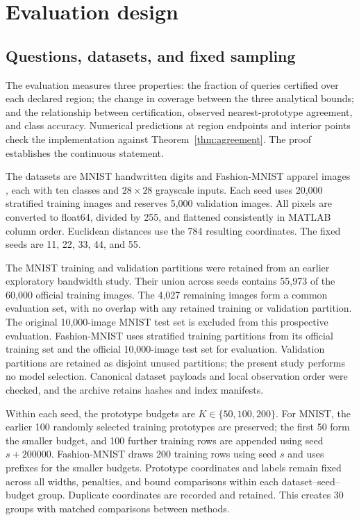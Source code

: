 \documentclass[preprint,12pt]{elsarticle}
\begin{document}
\section{Evaluation design}
\subsection{Questions, datasets, and fixed sampling}
The evaluation measures three properties: the fraction of queries certified over each declared region; the change in coverage between the three analytical bounds; and the relationship between certification, observed nearest-prototype agreement, and class accuracy. Numerical predictions at region endpoints and interior points check the implementation against Theorem~\ref{thm:agreement}. The proof establishes the continuous statement.

The datasets are MNIST handwritten digits \citep{lecun1998} and Fashion-MNIST apparel images \citep{xiao2017fashion}, each with ten classes and $28\times28$ grayscale inputs. Each seed uses 20,000 stratified training images and reserves 5,000 validation images. All pixels are converted to float64, divided by 255, and flattened consistently in MATLAB column order. Euclidean distances use the 784 resulting coordinates. The fixed seeds are 11, 22, 33, 44, and 55.

The MNIST training and validation partitions were retained from an earlier exploratory bandwidth study. Their union across seeds contains 55,973 of the 60,000 official training images. The 4,027 remaining images form a common evaluation set, with no overlap with any retained training or validation partition. The original 10,000-image MNIST test set is excluded from this prospective evaluation. Fashion-MNIST uses stratified training partitions from its official training set and the official 10,000-image test set for evaluation. Validation partitions are retained as disjoint unused partitions; the present study performs no model selection. Canonical dataset payloads and local observation order were checked, and the archive retains hashes and index manifests.

Within each seed, the prototype budgets are $K\in\{50,100,200\}$. For MNIST, the earlier 100 randomly selected training prototypes are preserved; the first 50 form the smaller budget, and 100 further training rows are appended using seed $s+200000$. Fashion-MNIST draws 200 training rows using seed $s$ and uses prefixes for the smaller budgets. Prototype coordinates and labels remain fixed across all widths, penalties, and bound comparisons within each dataset--seed--budget group. Duplicate coordinates are recorded and retained. This creates 30 groups with matched comparisons between methods.
\end{document}
